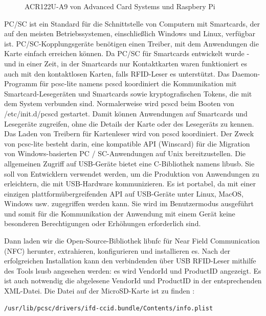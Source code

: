 \begin{figure}
	\caption{ACR122U-A9 von Advanced Card Systems und Raspbery Pi}
	\label{fig:rfid_hard}
\end{figure}
PC/SC ist ein Standard für die Schnittstelle von Computern mit Smartcards, der auf den meisten Betriebssystemen, einschließlich Windows und Linux, verfügbar ist. PC/SC-Kopplungsgeräte benötigen einen Treiber, mit dem Anwendungen die Karte einfach erreichen können. Da PC/SC für Smartcards entwickelt wurde - und in einer Zeit, in der Smartcards nur Kontaktkarten waren funktioniert es auch mit den kontaktlosen Karten, falls RFID-Leser es unterstützt. Das Daemon-Programm für pcsc-lite namens pcscd koordiniert die Kommunikation mit Smartcard-Lesegeräten und Smartcards sowie kryptografischen Tokens, die mit dem System verbunden sind. Normalerweise wird pcscd beim Booten von /etc/init.d/pcscd gestartet. Damit können Anwendungen auf Smartcards und Lesegeräte zugreifen, ohne die Details der Karte oder des Lesegeräts zu kennen. Das Laden von Treibern für Kartenleser wird von pcscd koordiniert. Der Zweck von pcsc-lite besteht darin, eine kompatible API (Winscard) für die Migration von Windows-basierten PC / SC-Anwendungen auf Unix bereitzustellen\cite{website:5}. Die allgemeinen Zugriff auf USB-Geräte bietet eine C-Bibliothek namens libusb.  Sie soll von Entwicklern verwendet werden, um die Produktion von Anwendungen zu erleichtern, die mit USB-Hardware kommunizieren. Es ist portabel, da mit einer einzigen plattformübergreifenden API auf USB-Geräte unter Linux, MacOS, Windows usw. zugegriffen werden kann. Sie wird im Benutzermodus ausgeführt und somit für die Kommunikation der Anwendung mit einem Gerät keine besonderen Berechtigungen oder Erhöhungen erforderlich sind.\cite{website:8}

Dann laden wir die Open-Source-Bibliothek libnfc für Near Field Communication (NFC) herunter, extrahieren, konfigurieren und installieren es. Nach der erfolgreichen Installation kann den verbindenden über USB RFID-Leser mithilfe des Tools lsusb angesehen werden: es wird VendorId und ProductID angezeigt. Es ist auch notwendig die abgelesene VendorId und ProductID in der entsprechenden XML-Datei. Die Datei auf der MicroSD-Karte ist zu finden :
\begin{lstlisting}
/usr/lib/pcsc/drivers/ifd-ccid.bundle/Contents/info.plist
\end{lstlisting}

